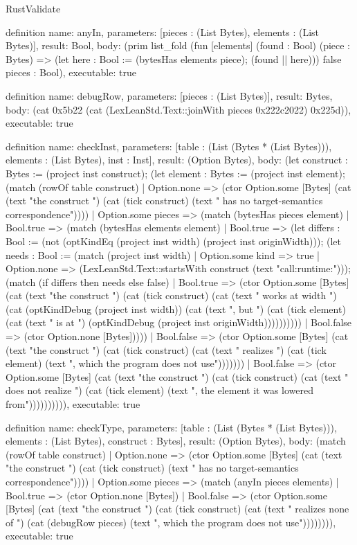 \begin{lexlean}{RustValidate}
\begin{semanticmodule}
definition{
  name: anyIn,
  parameters: [pieces : (List Bytes), elements : (List Bytes)],
  result: Bool,
  body: (prim list_fold (fun [elements] (found : Bool) (piece : Bytes) => (let here : Bool := (bytesHas elements piece); (found || here))) false pieces : Bool),
  executable: true
}

definition{
  name: debugRow,
  parameters: [pieces : (List Bytes)],
  result: Bytes,
  body: (cat 0x5b22 (cat (LexLeanStd.Text::joinWith pieces 0x222c2022) 0x225d)),
  executable: true
}

definition{
  name: checkInst,
  parameters: [table : (List (Bytes * (List Bytes))), elements : (List Bytes), inst : Inst],
  result: (Option Bytes),
  body: (let construct : Bytes := (project inst construct); (let element : Bytes := (project inst element); (match (rowOf table construct)
    | Option.none => (ctor Option.some [Bytes] (cat (text "the construct ") (cat (tick construct) (text " has no target-semantics correspondence"))))
    | Option.some pieces => (match (bytesHas pieces element)
      | Bool.true => (match (bytesHas elements element)
        | Bool.true => (let differs : Bool := (not (optKindEq (project inst width) (project inst originWidth))); (let needs : Bool := (match (project inst width)
          | Option.some kind => true
          | Option.none => (LexLeanStd.Text::startsWith construct (text "call:runtime:"))); (match (if differs then needs else false)
          | Bool.true => (ctor Option.some [Bytes] (cat (text "the construct ") (cat (tick construct) (cat (text " works at width ") (cat (optKindDebug (project inst width)) (cat (text ", but ") (cat (tick element) (cat (text " is at ") (optKindDebug (project inst originWidth))))))))))
          | Bool.false => (ctor Option.none [Bytes]))))
        | Bool.false => (ctor Option.some [Bytes] (cat (text "the construct ") (cat (tick construct) (cat (text " realizes ") (cat (tick element) (text ", which the program does not use")))))))
      | Bool.false => (ctor Option.some [Bytes] (cat (text "the construct ") (cat (tick construct) (cat (text " does not realize ") (cat (tick element) (text ", the element it was lowered from")))))))))),
  executable: true
}

definition{
  name: checkType,
  parameters: [table : (List (Bytes * (List Bytes))), elements : (List Bytes), construct : Bytes],
  result: (Option Bytes),
  body: (match (rowOf table construct)
    | Option.none => (ctor Option.some [Bytes] (cat (text "the construct ") (cat (tick construct) (text " has no target-semantics correspondence"))))
    | Option.some pieces => (match (anyIn pieces elements)
      | Bool.true => (ctor Option.none [Bytes])
      | Bool.false => (ctor Option.some [Bytes] (cat (text "the construct ") (cat (tick construct) (cat (text " realizes none of ") (cat (debugRow pieces) (text ", which the program does not use")))))))),
  executable: true
}


\end{semanticmodule}
\end{lexlean}
